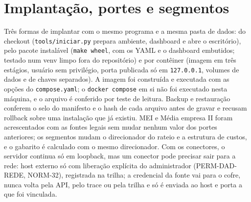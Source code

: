 \documentclass[10pt,a4paper]{article}
\newcommand{\code}[1]{\texttt{#1}}
\begin{document}
\section{Implantação, portes e segmentos}
Três formas de implantar com o mesmo programa e a mesma pasta de dados: do checkout (\code{tools/iniciar.py} prepara
ambiente, dashboard e abre o escritório), pelo pacote instalável (\code{make wheel}, com os YAML e o dashboard
embutidos; testado num venv limpo fora do repositório) e por contêiner (imagem em três estágios, usuário sem
privilégio, porta publicada só em \code{127.0.0.1}, volumes de dados e de chaves separados). A imagem foi construída e
executada com as opções do \code{compose.yaml}; o \code{docker compose} em si não foi executado nesta máquina, e o
arquivo é conferido por teste de leitura. Backup e restauração conferem o selo do manifesto e o hash de cada arquivo
antes de gravar e recusam rollback sobre uma instalação que já existiu. MEI e Média empresa II foram acrescentados com
as fontes legais \parencite{lc123,bndes} sem mudar nenhum valor dos portes anteriores; os segmentos mudam o
direcionador do rateio e a estrutura de custos, e o gabarito é calculado com o mesmo direcionador.
Com os conectores, o servidor continua só em loopback, mas um conector pode precisar sair para a rede: host externo
só com liberação explícita do administrador (PERM-DAD-REDE, NORM-32), registrada na trilha; a credencial da fonte vai
para o cofre, nunca volta pela API, pelo trace ou pela trilha e só é enviada ao host e porta a que foi vinculada.

\end{document}
